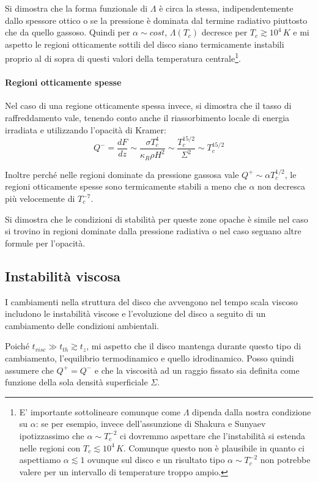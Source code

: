 \documentclass[a4paperbi]{article}
\begin{document}
	Si dimostra che la forma funzionale di $\Lambda$ è circa la stessa, indipendentemente dallo spessore ottico o se la pressione è dominata dal termine radiativo piuttosto che da quello gassoso. Quindi per $\alpha\sim cost$, $\Lambda(T_c)$ decresce per $T_c\gtrsim10^4\,K$ e mi aspetto le regioni otticamente sottili del disco siano termicamente instabili proprio al di sopra di questi valori della temperatura centrale\footnote{E' importante sottolineare comunque come $\Lambda$ dipenda dalla nostra condizione su $\alpha$: se per esempio, invece dell'assunzione di Shakura e Sunyaev ipotizzassimo che $\alpha\sim T^{-2}_c$ ci dovremmo aspettare che l'instabilità si estenda nelle regioni con $T_c\lesssim10^4\,K$. Comunque questo non è plausibile in quanto ci aspettiamo $\alpha\lesssim1$ ovunque sul disco e un risultato tipo $\alpha\sim T^{-2}_c$ non potrebbe valere per un intervallo di temperature troppo ampio.}.
		
	\paragraph{Regioni otticamente spesse}
	Nel caso di una regione otticamente spessa invece, si dimostra che il tasso di raffreddamento vale, tenendo conto anche il riassorbimento locale di energia irradiata e utilizzando l'opacità di Kramer:
	\begin{equation}
		Q^-=\frac{dF}{dz}\sim\frac{\sigma T_c^4}{\kappa_R\rho H^2}\sim\frac{T_c^{15/2}}{\Sigma^2}\sim T_c^{15/2}
	\end{equation}
	
	Inoltre perché nelle regioni dominate da pressione gassosa vale $Q^+\sim \alpha T_c^{1/2}$, le regioni otticamente spesse sono termicamente stabili a meno che $\alpha$ non decresca più velocemente di $T_c^{-7}$.
	
	Si dimostra che le condizioni di stabilità per queste zone opache è simile nel caso si trovino in regioni dominate dalla pressione radiativa o nel caso seguano altre formule per l'opacità.

\subsection{Instabilità viscosa}
	I cambiamenti nella struttura del disco che avvengono nel tempo scala viscoso includono le instabilità viscose e l'evoluzione del disco a seguito di un cambiamento delle condizioni ambientali.
	
	Poiché $t_{visc}\gg t_{th}\gtrsim t_z$, mi aspetto che il disco mantenga durante questo tipo di cambiamento, l'equilibrio termodinamico e quello idrodinamico. Posso quindi assumere che $Q^+=Q^-$ e che la viscosità ad un raggio fissato sia definita come funzione della sola densità superficiale $\Sigma$. 
	
\end{document}
